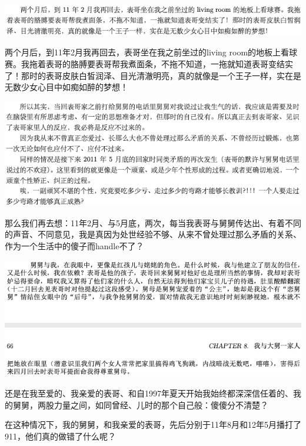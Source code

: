 \documentclass[9pt, b5paper]{article}
\begin{document}
\begin{center}
\includegraphics[width=.9\linewidth]{./pic/backups_plans_20210506_100552.png}
\end{center}

两个月后，到11年2月我再回去，表哥坐在我之前坐过的living room的地板上看球赛。我拖着表哥的胳膊要表哥帮我煮面条，不拖不知道，一拖就知道表哥变结实了！那时的表哥皮肤白皙润泽、目光清澈明亮，真的就像是一个王子一样，实在是无数少女心目中如痴如醉的梦想！

\begin{center}
\includegraphics[width=.9\linewidth]{./pic/backups_plans_20210423_102533.png}
\end{center}

那么我们再去想：11年2月、与5月底，两次，每当我表哥与舅舅传达出、有着不同的声音、不同意见，我是真因为处世经验不够、从来不曾处理过那么矛盾的关系、作为一个生活中的傻子而handle不了？

\begin{center}
\includegraphics[width=.9\linewidth]{./pic/backups_plans_20210423_103059.png}
\end{center}

还是在我至爱的、我亲爱的表哥、和自1997年夏天开始我始终都深深信任着的、我的舅舅，两股力量之间，如同曾经、儿时的那个自己般：傻傻分不清楚？

在这种情况下，我的舅舅，和我亲爱的表哥，先后分别于11年8月和12年5月播打了911，他们真的做错了什么呢？
\end{document}
